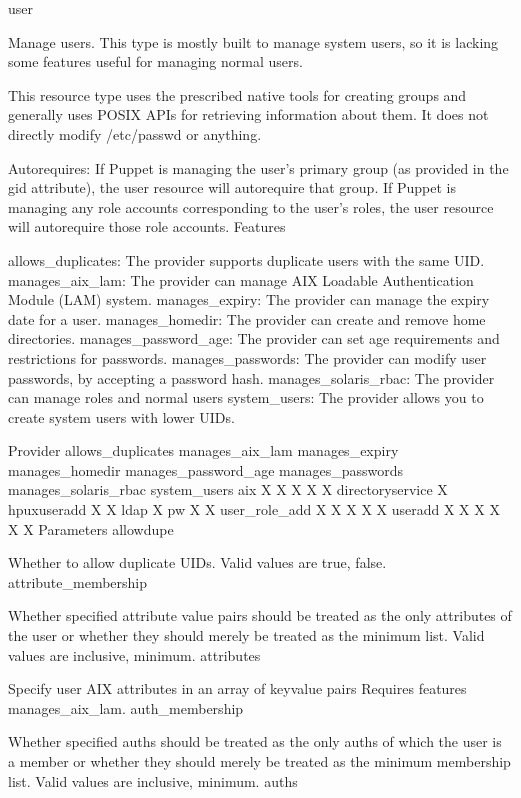 user

Manage users. This type is mostly built to manage system users, so it is lacking some features useful for managing normal users.

This resource type uses the prescribed native tools for creating groups and generally uses POSIX APIs for retrieving information about them. It does not directly modify /etc/passwd or anything.

Autorequires: If Puppet is managing the user’s primary group (as provided in the gid attribute), the user resource will autorequire that group. If Puppet is managing any role accounts corresponding to the user’s roles, the user resource will autorequire those role accounts.
Features

    allows_duplicates: The provider supports duplicate users with the same UID.
    manages_aix_lam: The provider can manage AIX Loadable Authentication Module (LAM) system.
    manages_expiry: The provider can manage the expiry date for a user.
    manages_homedir: The provider can create and remove home directories.
    manages_password_age: The provider can set age requirements and restrictions for passwords.
    manages_passwords: The provider can modify user passwords, by accepting a password hash.
    manages_solaris_rbac: The provider can manage roles and normal users
    system_users: The provider allows you to create system users with lower UIDs.

Provider 	allows_duplicates 	manages_aix_lam 	manages_expiry 	manages_homedir 	manages_password_age 	manages_passwords 	manages_solaris_rbac 	system_users
aix 	  	X 	X 	X 	X 	X 	  	 
directoryservice 	  	  	  	  	  	X 	  	 
hpuxuseradd 	X 	  	  	X 	  	  	  	 
ldap 	  	  	  	  	  	X 	  	 
pw 	X 	  	  	X 	  	  	  	 
user_role_add 	X 	  	  	X 	X 	X 	X 	 
useradd 	X 	  	X 	X 	X 	X 	  	X
Parameters
allowdupe

Whether to allow duplicate UIDs. Valid values are true, false.
attribute_membership

Whether specified attribute value pairs should be treated as the only attributes of the user or whether they should merely be treated as the minimum list. Valid values are inclusive, minimum.
attributes

Specify user AIX attributes in an array of keyvalue pairs Requires features manages_aix_lam.
auth_membership

Whether specified auths should be treated as the only auths of which the user is a member or whether they should merely be treated as the minimum membership list. Valid values are inclusive, minimum.
auths

